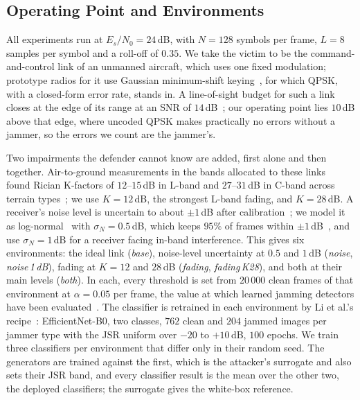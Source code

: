 \subsection{Operating Point and Environments}\label{sec:method:env}
All experiments run at $E_s/N_0=24$\,dB, with $N=128$ symbols per frame, $L=8$ samples per symbol and a roll-off of $0.35$.
We take the victim to be the command-and-control link of an unmanned aircraft, which uses one fixed modulation; prototype radios for it use Gaussian minimum-shift keying~\cite{bishop2017cnpc}, for which QPSK, with a closed-form error rate, stands in.
A line-of-sight budget for such a link closes at the edge of its range at an SNR of $14$\,dB~\cite{kakar2015uav}; our operating point lies $10$\,dB above that edge, where uncoded QPSK makes practically no errors without a jammer, so the errors we count are the jammer's.

Two impairments the defender cannot know are added, first alone and then together.
Air-to-ground measurements in the bands allocated to these links~\cite{kerczewski2015cosite} found Rician K-factors of $12$--$15$\,dB in L-band and $27$--$31$\,dB in C-band across terrain types~\cite{matolak2017airground1,sun2017airground2,matolak2017airground3,khawaja2019survey}; we use $K=12$\,dB, the strongest L-band fading, and $K=28$\,dB.
A receiver's noise level is uncertain to about $\pm1$\,dB after calibration~\cite{shellhammer2006noise,tandra2008snr}; we model it as log-normal~\cite{sonnenschein1992radiometric,he2017covert} with $\sigma_N=0.5$\,dB, which keeps $95\%$ of frames within $\pm1$\,dB~\cite{nikonowicz2019noise}, and use $\sigma_N=1$\,dB for a receiver facing in-band interference.
This gives six environments: the ideal link (\emph{base}), noise-level uncertainty at $0.5$ and $1$\,dB (\emph{noise}, \emph{noise\,1\,dB}), fading at $K=12$ and $28$\,dB (\emph{fading}, \emph{fading\,K28}), and both at their main levels (\emph{both}).
In each, every threshold is set from $20\,000$ clean frames of that environment at $\alpha=0.05$ per frame, the value at which learned jamming detectors have been evaluated~\cite{arcangeloni2024jamming}.
The classifier is retrained in each environment by Li et al.'s recipe~\cite{li2022jamming_ofdm}: EfficientNet-B0, two classes, $762$ clean and $204$ jammed images per jammer type with the JSR uniform over $-20$ to $+10$\,dB, $100$ epochs.
We train three classifiers per environment that differ only in their random seed.
The generators are trained against the first, which is the attacker's surrogate and also sets their JSR band, and every classifier result is the mean over the other two, the deployed classifiers; the surrogate gives the white-box reference.

